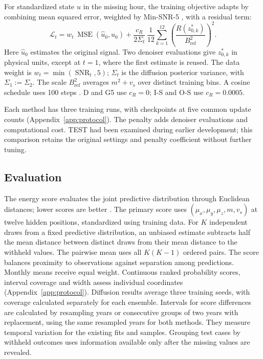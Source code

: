 \documentclass{article}
\begin{document}
For standardized state $u$ in the missing hour, the training objective adapts \citet{bastek2025pidm} by combining mean squared error, weighted by Min-SNR-5 \citep{hang2023minsnr}, with a residual term:
\begin{equation}
 \mathcal L_t=w_t\,\operatorname{MSE}(\hat u_0,u_0)
 +\frac{c_R}{2\Sigma_t}\,\frac1{12}\sum_{k=1}^{12}
 \left(\frac{R(z^*_{0,k})}{B_{\mathrm{ref}}^2}\right)^2.
\end{equation}
Here $\hat u_0$ estimates the original signal. Two denoiser evaluations give $z^*_{0,k}$ in physical units, except at $t=1$, where the first estimate is reused. The data weight is $w_t=\min(\operatorname{SNR}_t,5)$; $\Sigma_t$ is the diffusion posterior variance, with $\Sigma_1:=\Sigma_2$. The scale $B_{\mathrm{ref}}^2$ averages $m^2+v_s$ over distinct training bins. A cosine schedule uses 100 steps \citep{nichol2021improved}. D and G5 use $c_R=0$; I-S and O-S use $c_R=0.0005$.

Each method has three training runs, with checkpoints at five common update counts (Appendix~\ref{app:protocol}). The penalty adds denoiser evaluations and computational cost. TEST had been examined during earlier development; this comparison retains the original settings and penalty coefficient without further tuning.

\subsection{Evaluation}

The energy score evaluates the joint predictive distribution through Euclidean distances; lower scores are better \citep{gneiting2007strictly}. The primary score uses $(\mu_x,\mu_y,\mu_z,m,v_s)$ at twelve hidden positions, standardized using training data. For $K$ independent draws from a fixed predictive distribution, an unbiased estimate subtracts half the mean distance between distinct draws from their mean distance to the withheld values. The pairwise mean uses all $K(K-1)$ ordered pairs. The score balances proximity to observations against separation among predictions. Monthly means receive equal weight. Continuous ranked probability scores, interval coverage and width assess individual coordinates (Appendix~\ref{app:protocol}).
Diffusion results average three training seeds, with coverage calculated separately for each ensemble. Intervals for score differences are calculated by resampling years or consecutive groups of two years with replacement, using the same resampled years for both methods. They measure temporal variation for the existing fits and samples. Grouping test cases by withheld outcomes uses information available only after the missing values are revealed.
\end{document}
